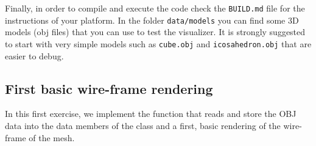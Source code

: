 \documentclass[a4paper,11pt]{article}
\makeatletter
\DeclareRobustCommand\onedot{\futurelet\@let@token\@onedot}
\def\@onedot{\ifx\@let@token.\else.\null\fi\xspace}
\def\ie{\emph{i.e}\onedot} \def\Ie{\emph{I.e}\onedot}
\newcommand{\hilight}[1]{\colorbox{bg}{#1}}
\newcommand{\coden}[1]{\texttt{#1}}
\newcommand{\code}[1]{\hilight{\texttt{#1}}}
\newcommand{\brand}[1]{\textsf{#1}\xspace}
\makeatother
\begin{document}
Finally, in order to compile and execute the code check the \code{BUILD.md} file for the instructions of your platform.
In the folder \code{data/models} you can find some 3D models (obj files) that you can use to test the visualizer.
It is strongly suggested to start with very simple models such as \coden{cube.obj} and \coden{icosahedron.obj} that are easier to debug.


\subsection{First basic wire-frame rendering}

In this first exercise, we implement the function that reads and store the \brand{OBJ} data into the data members of the class and a first, basic rendering of the wire-frame of the mesh.
\end{document}
